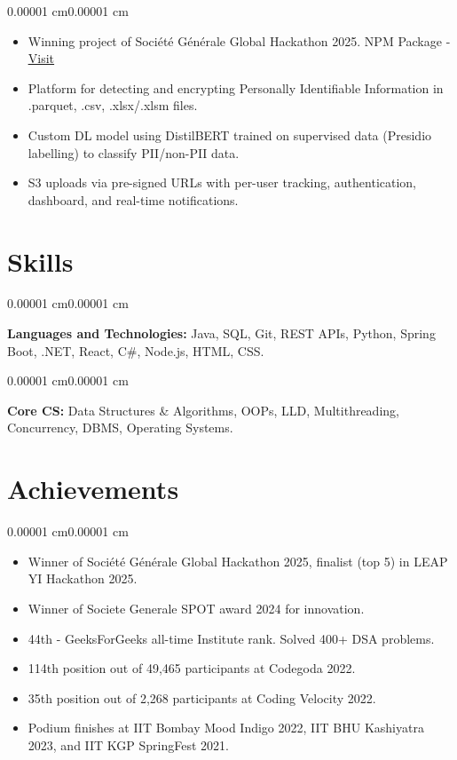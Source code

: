 \documentclass[10pt, letterpaper]{article}
\newenvironment{highlights}{
    \begin{itemize}[
        topsep=0.10 cm,
        parsep=0.10 cm,
        partopsep=0pt,
        itemsep=0pt,
        leftmargin=10pt
    ]
}{
    \end{itemize}
}
\newenvironment{onecolentry}{
    \begin{adjustwidth}{0.00001 cm}{0.00001 cm}
}{
    \end{adjustwidth}
}
\begin{document}
\begin{onecolentry}
\begin{highlights}
    \item Winning project of Société Générale Global Hackathon 2025. NPM Package - \underline{\href{https://www.npmjs.com/package/@sgbots/data-anonymiser}{Visit}}
    \item Platform for detecting and encrypting Personally Identifiable Information in .parquet, .csv, .xlsx/.xlsm files.
    \item Custom DL model using DistilBERT trained on supervised data (Presidio labelling) to classify PII/non-PII data.
    \item S3 uploads via pre-signed URLs with per-user tracking, authentication, dashboard, and real-time notifications.
\end{highlights}
\end{onecolentry}

\section{Skills}

\begin{onecolentry}
\textbf{Languages and Technologies:} Java, SQL, Git, REST APIs, Python, Spring Boot, .NET, React, C\#, Node.js, HTML, CSS.
\end{onecolentry}

\vspace{0.10 cm}

\begin{onecolentry}
\textbf{Core CS:} Data Structures \& Algorithms, OOPs, LLD, Multithreading, Concurrency, DBMS, Operating Systems.
\end{onecolentry}

\section{Achievements}

\begin{onecolentry}
\begin{highlights}
    \item Winner of Société Générale Global Hackathon 2025, finalist (top 5) in LEAP YI Hackathon 2025.
    \item Winner of Societe Generale SPOT award 2024 for innovation.
    \item 44th - GeeksForGeeks all-time Institute rank. Solved 400+ DSA problems.
    \item 114th position out of 49,465 participants at Codegoda 2022.
    \item 35th position out of 2,268 participants at Coding Velocity 2022.
    \item Podium finishes at IIT Bombay Mood Indigo 2022, IIT BHU Kashiyatra 2023, and IIT KGP SpringFest 2021.
\end{highlights}
\end{onecolentry}
\end{document}

